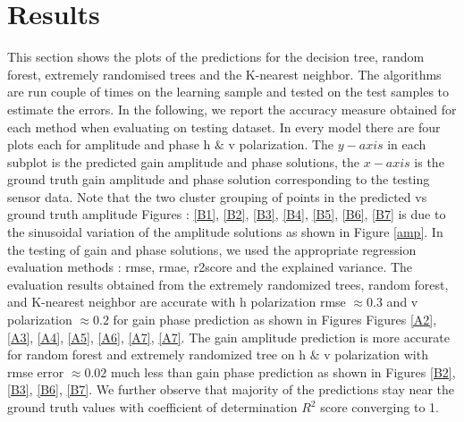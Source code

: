 \section{Results}
\label{sec3}
This section shows the plots of the predictions for the decision tree, random forest, extremely randomised trees and the K-nearest neighbor. The algorithms are run couple of times on the learning sample and tested on the test samples to estimate the errors. In the following, we report the accuracy measure obtained for each method when evaluating on testing dataset. In every model there are four plots each for amplitude and phase h $\&$ v polarization. The $y-axis$ in each subplot is the predicted gain amplitude  and phase solutions, the $x-axis$ is the ground truth gain amplitude and phase solution corresponding to the testing sensor data. Note that the two cluster grouping of points in the predicted vs ground truth amplitude Figures : \ref{B1}, \ref{B2}, \ref{B3}, \ref{B4}, \ref{B5}, \ref{B6}, \ref{B7} is due to the sinusoidal variation of the amplitude solutions as shown in Figure \ref{amp}. In the testing of gain and phase solutions, we used the appropriate regression evaluation methods : rmse, rmae, r2score and the explained variance. The evaluation results obtained from the extremely randomized trees, random forest, and K-nearest neighbor are accurate with h polarization rmse $\approx 0.3$  and v polarization $\approx 0.2$ for gain phase prediction as shown in Figures Figures \ref{A2}, \ref{A3}, \ref{A4}, \ref{A5}, \ref{A6}, \ref{A7}, \ref{A7}. The gain amplitude prediction is more accurate for random forest and extremely randomized tree on h $\&$ v polarization with rmse error  $\approx 0.02$ much less than gain phase prediction as shown in Figures \ref{B2}, \ref{B3}, \ref{B6}, \ref{B7}. We further observe that majority of the predictions stay near the ground truth values with coefficient of determination $R^2$ score converging to 1.
